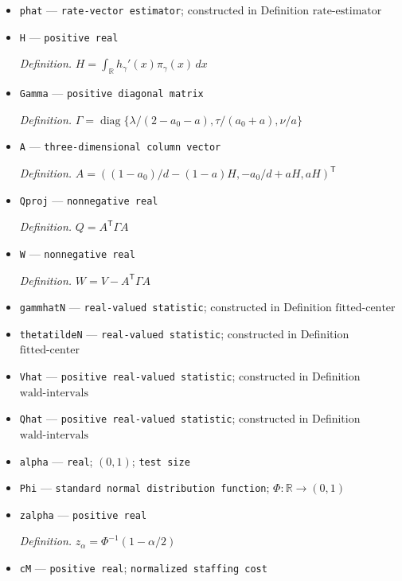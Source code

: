 \documentclass{article}
\begin{document}
\begin{itemize}
  \item \texttt{phat} --- \texttt{rate-\allowbreak{}vector estimator}; constructed in Definition \(\mathrm{rate\mbox{-}estimator}\)
  \item \texttt{H} --- \texttt{positive real}
  \par\smallskip\noindent\emph{Definition.} \(H=\int_{\mathbb R}h_\gamma'(x)\pi_\gamma(x)\,dx\)
  \item \texttt{Gamma} --- \texttt{positive diagonal matrix}
  \par\smallskip\noindent\emph{Definition.} \(\Gamma=\operatorname{diag}\{\lambda/(2-a_0-a),\tau/(a_0+a),\nu/a\}\)
  \item \texttt{A} --- \texttt{three-\allowbreak{}dimensional column vector}
  \par\smallskip\noindent\emph{Definition.} \(A=((1-a_0)/d-(1-a)H,-a_0/d+aH,aH)^{\mathsf T}\)
  \item \texttt{Qproj} --- \texttt{nonnegative real}
  \par\smallskip\noindent\emph{Definition.} \(Q=A^{\mathsf T}\Gamma A\)
  \item \texttt{W} --- \texttt{nonnegative real}
  \par\smallskip\noindent\emph{Definition.} \(W=V-A^{\mathsf T}\Gamma A\)
  \item \texttt{gammhatN} --- \texttt{real-\allowbreak{}valued statistic}; constructed in Definition \(\mathrm{fitted\mbox{-}center}\)
  \item \texttt{thetatildeN} --- \texttt{real-\allowbreak{}valued statistic}; constructed in Definition \(\mathrm{fitted\mbox{-}center}\)
  \item \texttt{Vhat} --- \texttt{positive real-\allowbreak{}valued statistic}; constructed in Definition \(\mathrm{wald\mbox{-}intervals}\)
  \item \texttt{Qhat} --- \texttt{positive real-\allowbreak{}valued statistic}; constructed in Definition \(\mathrm{wald\mbox{-}intervals}\)
  \item \texttt{alpha} --- \texttt{real}; \((0,1)\); \texttt{test size}
  \item \texttt{Phi} --- \texttt{standard normal distribution function}; \(\Phi:\mathbb R\to(0,1)\)
  \item \texttt{zalpha} --- \texttt{positive real}
  \par\smallskip\noindent\emph{Definition.} \(z_\alpha=\Phi^{-1}(1-\alpha/2)\)
  \item \texttt{cM} --- \texttt{positive real}; \texttt{normalized staffing cost}

\end{itemize}
\end{document}
